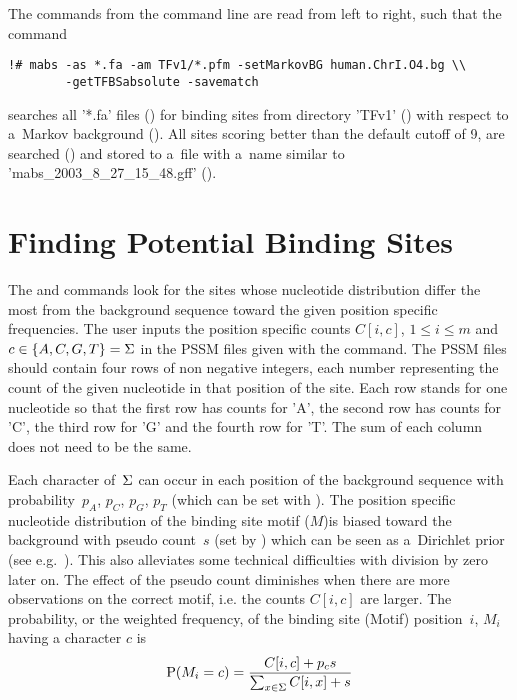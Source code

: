 The commands from the command line are read from left to right, such
that the command%
\begin{verbatim}!# mabs -as *.fa -am TFv1/*.pfm -setMarkovBG human.ChrI.O4.bg \\
        -getTFBSabsolute -savematch \end{verbatim}%
searches all '*.fa' files () for binding sites from
directory 'TFv1' () with respect to a~Markov
background (). All sites scoring
better than the default cutoff of 9, are searched
() and stored to a~file with a~name similar to
 'mabs\_2003\_8\_27\_15\_48.gff' ().



\section{Finding Potential Binding Sites}
\label{sec:TFBSscan}

The  and  commands look
for the sites whose nucleotide distribution differ the most from the
background sequence toward the given position specific
frequencies. The user inputs the position specific counts $C[i,c]$,
$1\le i \le m$ and $c\in\{A,C,G,T\}=\Sigma$ in
the PSSM files given with the  command. The PSSM
files should contain four rows of non negative integers, each number
representing the count of the given nucleotide in that position of the
site. Each row stands for one nucleotide so that the first row has
counts for 'A', the second row has counts for 'C', the third row for
'G' and the fourth row for 'T'.  The sum of each column does not need
to be the same.


Each character of~$\Sigma$ can occur in each position of the
background sequence with probability~$p_A$, $p_C$, $p_G$, $p_T$ (which
can be set with ).  The position specific
nucleotide distribution of the binding site motif ($M$)is biased toward the
background with pseudo count~$s$ (set by )
which can be seen as a~Dirichlet prior (see
e.g.~\cite{durbin98}). This also alleviates some technical difficulties
with division by zero later on. The effect of the pseudo count
diminishes when there are more observations on the correct motif,
i.e. the counts $C[i,c]$ are larger. The probability, or the weighted
frequency, of the binding site (Motif) position~$i$, $M_i$ having a
character $c$ is
\begin{equation}
  \label{eq:motifProb}
  \mathrm{P}(M_i=c)=\frac{C[i,c]+p_cs}{\sum_{x\in\Sigma}C[i,x]+s}
\end{equation}

